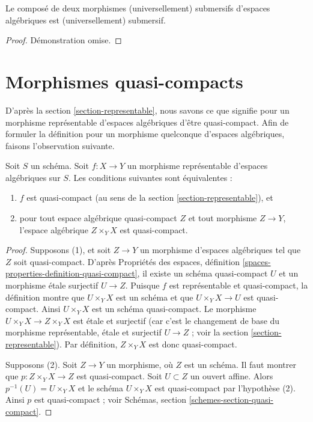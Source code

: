 \begin{lemma}
\label{lemma-composition-universally-submersive}
Le composé de deux morphismes (universellement) submersifs
d'espaces algébriques est (universellement) submersif.
\end{lemma}

\begin{proof}
Démonstration omise.
\end{proof}












\section{Morphismes quasi-compacts}
\label{section-quasi-compact}

\noindent
D'après la section \ref{section-representable}, nous savons ce que signifie
pour un morphisme représentable d'espaces algébriques d'être quasi-compact.
Afin de formuler la définition pour un morphisme quelconque
d'espaces algébriques, faisons l'observation suivante.

\begin{lemma}
\label{lemma-characterize-representable-quasi-compact}
Soit $S$ un schéma.
Soit $f : X \to Y$ un morphisme représentable d'espaces algébriques sur $S$.
Les conditions suivantes sont équivalentes :
\begin{enumerate}
\item $f$ est quasi-compact
(au sens de la section \ref{section-representable}), et
\item pour tout espace algébrique quasi-compact $Z$ et tout morphisme
$Z \to Y$, l'espace algébrique $Z \times_Y X$ est quasi-compact.
\end{enumerate}
\end{lemma}

\begin{proof}
Supposons (1), et soit $Z \to Y$ un morphisme d'espaces algébriques tel que
$Z$ soit quasi-compact. D'après
Propriétés des espaces,
définition \ref{spaces-properties-definition-quasi-compact},
il existe un schéma quasi-compact $U$ et un morphisme \'etale surjectif
$U \to Z$. Puisque $f$ est représentable et quasi-compact,
la définition montre que $U \times_Y X$ est un schéma et que
$U \times_Y X \to U$ est quasi-compact. Ainsi $U \times_Y X$ est
un schéma quasi-compact. Le morphisme $U \times_Y X \to Z \times_Y X$
est \'etale et surjectif (car c'est le changement de base du morphisme
représentable, \'etale et surjectif $U \to Z$ ; voir la
section \ref{section-representable}).
Par définition, $Z \times_Y X$ est donc quasi-compact.

\medskip\noindent
Supposons (2). Soit $Z \to Y$ un morphisme, où $Z$ est un schéma.
Il faut montrer que $p : Z \times_Y X \to Z$ est quasi-compact.
Soit $U \subset Z$ un ouvert affine. Alors $p^{-1}(U) = U \times_Y X$
et le schéma $U \times_Y X$ est quasi-compact par l'hypothèse (2).
Ainsi $p$ est quasi-compact ; voir
Schémas, section \ref{schemes-section-quasi-compact}.
\end{proof}

